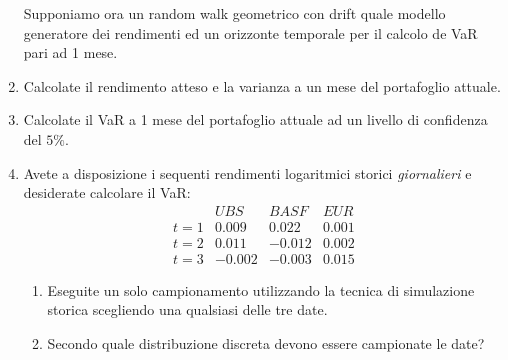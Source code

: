 \documentclass[a4paper,12pt]{article}
\begin{document}
\begin{enumerate}
Supponiamo ora un random walk geometrico con drift quale modello generatore
dei rendimenti ed un orizzonte temporale per il calcolo de VaR pari ad 1
mese. 

\item Calcolate il rendimento atteso e la varianza a un mese del portafoglio
attuale.

\item Calcolate il VaR a 1 mese del portafoglio attuale ad un livello di
confidenza del $5\%$.

\item Avete a disposizione i sequenti rendimenti logaritmici storici \emph{%
giornalieri} e desiderate calcolare il VaR:%
\[
\begin{array}{cccc}
& UBS & BASF & EUR \\ 
t=1 & 0.009 & 0.022 & 0.001 \\ 
t=2 & 0.011 & -0.012 & 0.002 \\ 
t=3 & -0.002 & -0.003 & 0.015%
\end{array}%
\]

\begin{enumerate}
\item Eseguite un solo campionamento utilizzando la tecnica di simulazione
storica scegliendo una qualsiasi delle tre date.

\item Secondo quale distribuzione discreta devono essere campionate le date?
\end{enumerate}
\end{enumerate}
\end{document}
